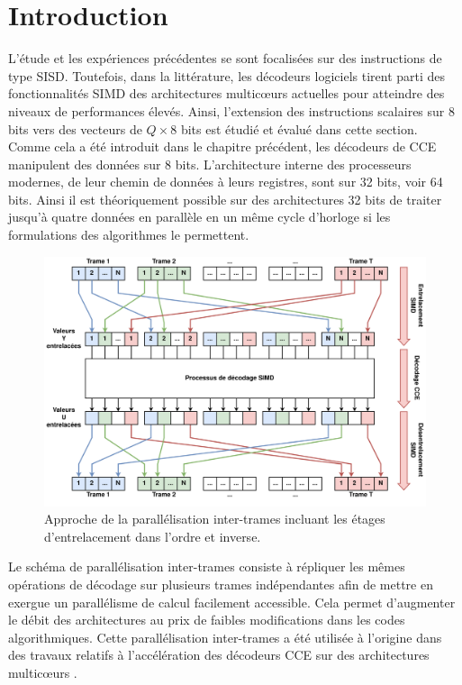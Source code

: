 \documentclass[../main.tex]{subfiles}
\begin{document}
\section{Introduction}
% 
%
% 
% 
L'étude et les expériences précédentes se sont focalisées sur des instructions de type SISD. Toutefois, dans la littérature, les décodeurs logiciels tirent parti des fonctionnalités SIMD des architectures multicœurs actuelles pour atteindre des niveaux de performances élevés. Ainsi, l'extension des instructions scalaires sur 8 bits vers des vecteurs de $Q \times 8$ bits est étudié et évalué dans cette section. Comme cela a été introduit dans le chapitre précédent, les décodeurs de CCE manipulent des données sur 8 bits. L'architecture interne des processeurs modernes, de leur chemin de données à leurs registres, sont sur 32 bits, voir 64 bits. Ainsi il est théoriquement possible sur des architectures 32 bits de traiter jusqu'à quatre données en parallèle en un même cycle d'horloge si les formulations des algorithmes le permettent.
\begin{figure}[!tb]
	\centering
	\includegraphics[scale=.08]{figs/SIMD.png}
	\caption{Approche de la parallélisation inter-trames incluant les étages d'entrelacement dans l'ordre et inverse.}
	\label{process_SIMD}
\end{figure}
Le schéma de parallélisation inter-trames consiste à répliquer les mêmes opérations de décodage sur plusieurs trames indépendantes afin de mettre en exergue un parallélisme de calcul facilement accessible. 
Cela permet d'augmenter le débit des architectures au prix de faibles modifications dans les codes algorithmiques. 
Cette parallélisation inter-trames a été utilisée à l'origine dans des travaux relatifs à l'accélération des décodeurs CCE sur des architectures multicœurs \cite{Adrien,ri:LeG19c,LDPC:SOFT4}. 
\end{document}
